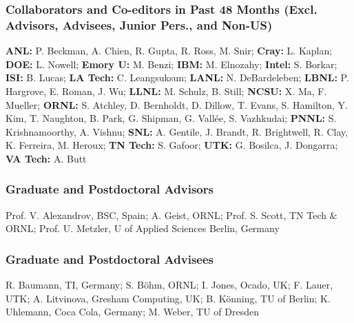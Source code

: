 \subsubsection*{Collaborators and Co-editors in Past 48 Months
          (Excl. Advisors, Advisees, Junior Pers., and Non-US)}
\vspace*{-1ex}

\textbf{ANL:}
  P. Beckman,
  A. Chien,
  R. Gupta,
  R. Ross,
  M. Snir;
\textbf{Cray:}
  L. Kaplan;
\textbf{DOE:}
  L. Nowell;
\textbf{Emory U:}
  M. Benzi;
\textbf{IBM:}
  M. Elnozahy;
\textbf{Intel:}
  S. Borkar;
\textbf{ISI:}
  B. Lucas;
\textbf{LA Tech:}
  C. Leangsuksun;
\textbf{LANL:}
  N. DeBardeleben;
\textbf{LBNL:}
  P. Hargrove,
  E. Roman,
  J. Wu;
\textbf{LLNL:}
  M. Schulz,
  B. Still;
\textbf{NCSU:}
  X. Ma,
  F. Mueller;
\textbf{ORNL:}
  S. Atchley,
  D. Bernholdt,
  D. Dillow,
  T. Evans,
  S. Hamilton,
  Y. Kim,
  T. Naughton,
  B. Park,
  G. Shipman,
  G. Vall\'ee,
  S. Vazhkudai;
\textbf{PNNL:}
  S. Krishnamoorthy,
  A. Vishnu;
\textbf{SNL:}
  A. Gentile,
  J. Brandt,
  R. Brightwell,
  R. Clay,
  K. Ferreira,
  M. Heroux;
\textbf{TN Tech:}
  S. Gafoor;
\textbf{UTK:}
  G. Bosilca,
  J. Dongarra;
\textbf{VA Tech:} 
  A. Butt

\vspace*{-2ex}
\subsubsection*{Graduate and Postdoctoral Advisors}
\vspace*{-1ex}

Prof. V. Alexandrov, BSC, Spain;
A. Geist, ORNL;
Prof. S. Scott, TN Tech \& ORNL;
Prof. U. Metzler, U of Applied Sciences Berlin, Germany

\vspace*{-2ex}
\subsubsection*{Graduate and Postdoctoral Advisees}
\vspace*{-1ex}

R. Baumann, TI, Germany;
S. B{\"o}hm, ORNL;
I. Jones, Ocado, UK;
F. Lauer, UTK;
A. Litvinova, Gresham Computing, UK;
B. K{\"o}nning, TU of Berlin;
K. Uhlemann, Coca Cola, Germany;
M. Weber, TU of Dresden

\pagebreak
\endinput


